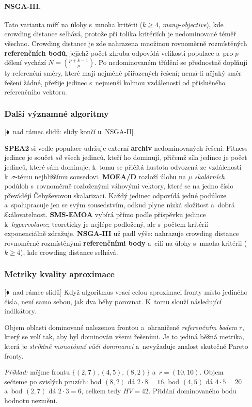 \documentclass[11pt,a4paper]{article}
\theoremstyle{definition}
\newcommand{\mimo}{\textcolor{markcol}{\textsf{\footnotesize[$\blacklozenge$~nad rámec slidů]}}}
\newcommand{\mimoq}[1]{\textcolor{markcol}{\textsf{\footnotesize[$\blacklozenge$~nad rámec slidů: #1]}}}
\begin{document}
\paragraph{NSGA-III.} Tato varianta míří na úlohy s~mnoha kritérii ($k \ge 4$,
\emph{many-objective}), kde crowding distance selhává, protože při tolika kritériích je
nedominované téměř všechno. Crowding distance je zde nahrazena množinou rovnoměrně
rozmístěných \textbf{referenčních bodů}, jejichž počet zhruba odpovídá velikosti
populace a~pro $p$ dělení vychází $N = \binom{p+k-1}{p}$. Po nedominovaném třídění se
přednostně doplňují ty referenční směry, které mají nejméně přiřazených řešení;
nemá-li nějaký směr řešení žádné, přežije jedinec s~nejmenší kolmou vzdáleností od
příslušného referenčního vektoru.

\subsubsection{Další významné algoritmy}

\noindent\mimoq{slidy končí u~NSGA-II}

\textbf{SPEA2} si vedle populace udržuje externí \textbf{archiv} nedominovaných řešení.
Fitness jedince je součet \emph{sil} všech jedinců, kteří ho dominují, přičemž síla
jedince je počet jedinců, které sám dominuje; k~tomu se přičítá hustota odvozená ze
vzdálenosti k~$\sigma$-tému nejbližšímu sousedovi.
\textbf{MOEA/D} rozloží úlohu na $\mu$ \emph{skalárních} podúloh s~rovnoměrně
rozloženými váhovými vektory, které se na jedno číslo převádějí Čebyševovou skalarizací.
Každý jedinec odpovídá jedné podúloze a~spolupracuje jen se svým sousedstvím, odkud
plyne nízká složitost a~dobrá škálovatelnost.
\textbf{SMS-EMOA} vybírá přímo podle příspěvku jedince k~\emph{hypervolume}; teoreticky
je nejlépe podložený, ale s~počtem kritérií exponenciálně zdražuje.
\textbf{NSGA-III} už padl výše: nahrazuje crowding distance rovnoměrně rozmístěnými
\textbf{referenčními body} a~cílí na úlohy s~mnoha kritérii ($k \ge 4$), kde crowding
distance selhává.

\subsubsection{Metriky kvality aproximace}

\noindent\mimo{} Když algoritmus vrací celou aproximaci fronty místo jediného čísla,
není samo sebou, jak dva běhy porovnat. K~tomu slouží následující indikátory.

\begin{defbox}
Objem oblasti dominované nalezenou frontou a~ohraničené \emph{referenčním bodem} $r$,
který se volí tak, aby byl dominován všemi řešeními. Je to jediná běžná metrika, která
je \emph{striktně monotónní vůči dominanci} a~nevyžaduje znalost skutečné Pareto fronty.

\emph{Příklad:} mějme frontu $\{(2,7), (4,5), (8,2)\}$ a~$r = (10,10)$. Objem sečteme po
svislých pruzích: bod $(8,2)$ dá $2\cdot8 = 16$, bod $(4,5)$ dá $4\cdot5 = 20$ a~bod
$(2,7)$ dá $2\cdot3 = 6$, celkem tedy $HV = 42$. Přidání dominovaného bodu hodnotu
nezmění.
\end{defbox}
\end{document}
